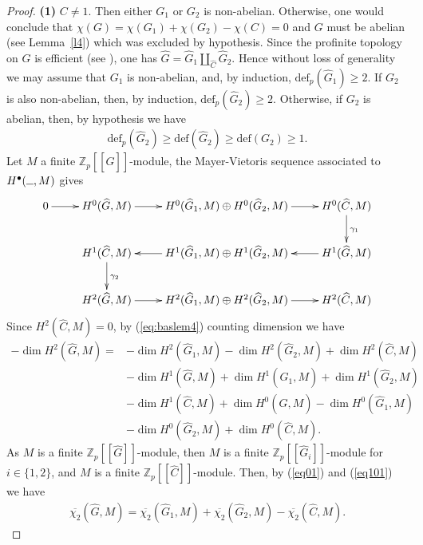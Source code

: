 \documentclass[10pt]{amsart}
\theoremstyle{plain}
\theoremstyle{definition}
\theoremstyle{remark}
\numberwithin{prop}{section}
\numberwithin{example}{section}
\numberwithin{equation}{section}
\newcommand{\Z}{\mathbb{Z}}
\newcommand{\de}{\mathrm{def}}
\newcommand{\argu}{\hbox to 1.5ex{\hrulefill}}  %
\begin{document}
\begin{proof}
		\noindent
		{\bf (1)} $C\neq 1$. Then either $G_1$ or $G_2$ is non-abelian. Otherwise, one would conclude that 
		$\chi(G)= \chi(G_1)+\chi(G_2)-\chi(C)=0$ and $G$ must be abelian
		(see Lemma~\ref{l4}) which was excluded by hypothesis.  Since the profinite topology on $G$ is efficient (see  \cite[\S 3, Thm.~3.8]{gru} ), one has $\widehat{G}=\widehat{G}_1\amalg_{\widehat{C}}\widehat{G}_2$.   Hence without loss of generality we may assume that $G_1$ is non-abelian, and,
		by induction, $\de_p(\widehat{G}_1)\geq 2$. If $G_2$ is also non-abelian, then, 	by induction, $\de_p(\widehat{G}_2)\geq 2$. Otherwise, if $G_2$ is abelian, then, by hypothesis we have    
		\begin{align}
			\de_p(\widehat{G}_2)\geq \de(\widehat{G}_2)\geq \de(G_2)\geq  1.
		\end{align}
		Let  $M$ a finite $\Z_p[[\widehat{G}]]$-module,  the Mayer-Vietoris sequence associated to
		$H^\bullet(\argu,M)$  gives  
		\begin{equation}
		\label{eq:baslem4}
		\xymatrix{
			0 \ar[r]	& H^0(\widehat{G},M)\ar[r]& 
			H^0(\widehat{G}_1,M)\oplus  H^0(\widehat{G}_2,M)\ar[r]&
			H^0(\widehat{C},M)\ar[d]^{\gamma_1}\\
			&H^1(\widehat{C},M)\ar[d]^{\gamma_2}& 
			H^1(\widehat{G}_1,M)\oplus H^1(\widehat{G}_2,M)\ar[l]&
			H^1(\widehat{G},M)\ar[l]\\
			& 	H^2(\widehat{G},M)\ar[r]&H^2(\widehat{G}_1,M)\oplus H^2(\widehat{G}_2,M)\ar[r]&H^2(\widehat{C},M)
		} 
		\end{equation} 
		Since  $H^2(\widehat{C},M)=0$, by  (\ref{eq:baslem4}) counting dimension we have
  		\begin{align}\label{eq101}
			-\dim H^2(\widehat{G},M)=&-\dim H^2(\widehat{G}_1,M)-\dim H^2(\widehat{G}_2,M)+	\dim H^2(\widehat{C},M)\\ &\nonumber -\dim H^1(\widehat{G},M) +
			\dim H^1(\widehat{G}_1,M)+\dim H^1(\widehat{G}_2,M)\\ &\nonumber -\dim H^1(\widehat{C},M)+\dim H^0(\widehat{G},M)-\dim H^0(\widehat{G}_1,M)\\ &\nonumber -\dim H^0(\widehat{G}_2,M)+\dim H^0(\widehat{C},M).
		\end{align}	
		As  $M$ is  a finite $\Z_p[[\widehat{G}]]$-module, then  $M$ is  a finite  $\Z_p[[\widehat{G}_i]]$-module for $i\in\{1,2\}$, and  $M$ is a  finite $\Z_p[[\widehat{C}]]$-module. Then, by  (\ref{eq01}) and (\ref{eq101}) we have 
		\begin{align}\label{et1}
				\overline{\chi_2}(\widehat{G},M)=	\overline{\chi_2}(\widehat{G}_1,M)+	\overline{\chi_2}(\widehat{G}_2,M)-	\overline{\chi_2}(\widehat{C},M).

\end{align}
\end{proof}
\end{document}
